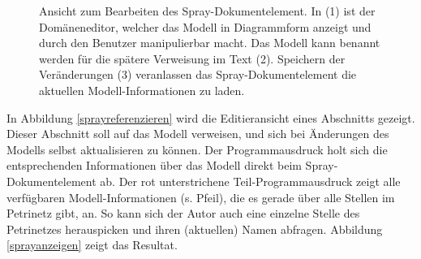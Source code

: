  
\begin{figure}[h!]
\centering
\advance\leftskip-2.5cm
\caption[Spray-Dokumentelement editieren]{ Ansicht zum Bearbeiten des Spray-Dokumentelement. In (1) ist der Domäneneditor, welcher das Modell in Diagrammform anzeigt und durch den Benutzer manipulierbar macht. Das Modell kann benannt werden für die spätere Verweisung im Text (2). Speichern der Veränderungen (3) veranlassen das Spray-Dokumentelement die aktuellen Modell-Informationen zu laden. }\label{sprayeditieren}
\end{figure}
 
In Abbildung \ref{sprayreferenzieren} wird die Editieransicht eines Abschnitts gezeigt. Dieser Abschnitt soll auf das Modell verweisen, und sich bei Änderungen des Modells selbst aktualisieren zu können. Der Programmausdruck holt sich die entsprechenden Informationen über das Modell direkt beim Spray-Dokumentelement ab. Der rot unterstrichene Teil-Programmausdruck zeigt alle verfügbaren Modell-Informationen (s. Pfeil),  die es gerade über alle Stellen im Petrinetz gibt, an. So kann sich der Autor auch eine einzelne Stelle des Petrinetzes herauspicken und ihren (aktuellen) Namen abfragen. Abbildung \ref{sprayanzeigen} zeigt das Resultat.

